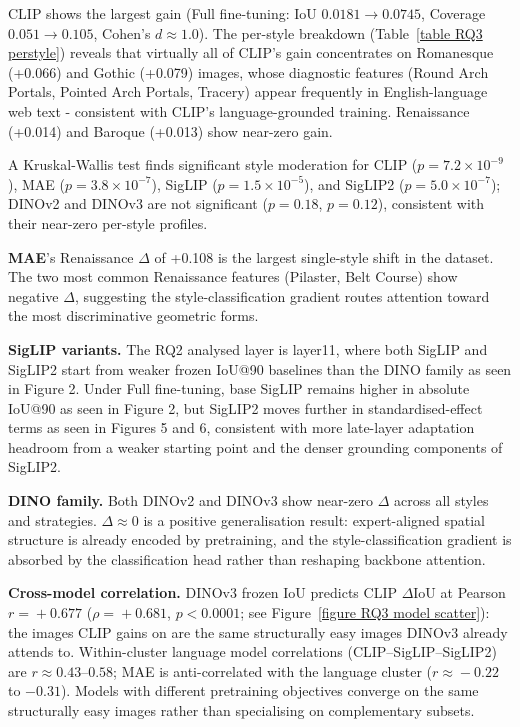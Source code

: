 \documentclass[lineno,pdflatex,sn-mathphys-num]{sn-jnl}%
\theoremstyle{thmstyleone}%
\theoremstyle{thmstyletwo}%
\theoremstyle{thmstylethree}%
\begin{document}
CLIP shows the largest gain (Full fine-tuning: IoU $0.0181\!\to\!0.0745$, Coverage $0.051\!\to\!0.105$, Cohen's $d\!\approx\!1.0$). The per-style breakdown (Table~\ref{table RQ3 perstyle}) reveals that virtually all of CLIP's gain concentrates on Romanesque (+0.066) and Gothic (+0.079) images, whose diagnostic features (Round Arch Portals, Pointed Arch Portals, Tracery) appear frequently in English-language web text - consistent with CLIP's language-grounded training. Renaissance (+0.014) and Baroque (+0.013) show near-zero gain.

A Kruskal-Wallis test finds significant style moderation for CLIP ($p\!=\!7.2\!\times\!10^{-9}$), MAE ($p\!=\!3.8\!\times\!10^{-7}$), SigLIP ($p\!=\!1.5\!\times\!10^{-5}$), and SigLIP2 ($p\!=\!5.0\!\times\!10^{-7}$); DINOv2 and DINOv3 are not significant ($p\!=\!0.18$, $p\!=\!0.12$), consistent with their near-zero per-style profiles.

\textbf{MAE}'s Renaissance $\Delta$ of +0.108 is the largest single-style shift in the dataset. The two most common Renaissance features (Pilaster, Belt Course) show negative $\Delta$, suggesting the style-classification gradient routes attention toward the most discriminative geometric forms.

\textbf{SigLIP variants.} The RQ2 analysed layer is layer11, where both SigLIP and SigLIP2 start from weaker frozen IoU@90 baselines than the DINO family as seen in Figure 2. Under Full fine-tuning, base SigLIP remains higher in absolute IoU@90 as seen in Figure 2, but SigLIP2 moves further in standardised-effect terms as seen in Figures 5 and 6, consistent with more late-layer adaptation headroom from a weaker starting point and the denser grounding components of SigLIP2.

\textbf{DINO family.} Both DINOv2 and DINOv3 show near-zero $\Delta$ across all styles and strategies. $\Delta\!\approx\!0$ is a positive generalisation result: expert-aligned spatial structure is already encoded by pretraining, and the style-classification gradient is absorbed by the classification head rather than reshaping backbone attention.


\textbf{Cross-model correlation.} DINOv3 frozen IoU predicts CLIP $\Delta$IoU at Pearson $r\!=\!+0.677$ ($\rho\!=\!+0.681$, $p\!<\!0.0001$; see Figure~\ref{figure RQ3 model scatter}): the images CLIP gains on are the same structurally easy images DINOv3 already attends to. Within-cluster language model correlations (CLIP--SigLIP--SigLIP2) are $r\!\approx\!0.43$--$0.58$; MAE is anti-correlated with the language cluster ($r\!\approx\!{-}0.22$ to ${-}0.31$). Models with different pretraining objectives converge on the same structurally easy images rather than specialising on complementary subsets.
\end{document}
